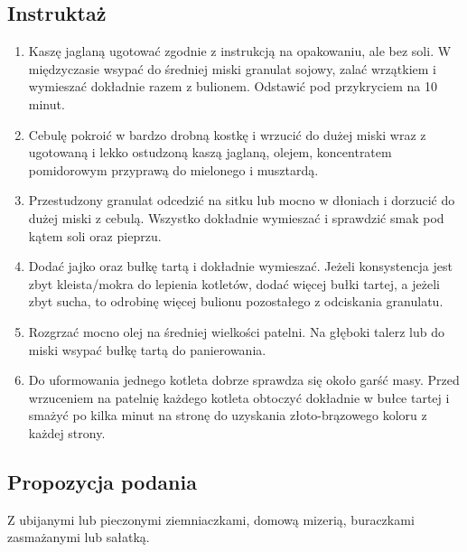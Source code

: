 \documentclass[a4paper,10pt]{book}
\begin{document}
\vspace{0.5cm} 

\subsection*{Instruktaż}
\begin{enumerate}
    \item Kaszę jaglaną ugotować zgodnie z instrukcją na opakowaniu, ale bez soli. W międzyczasie wsypać do średniej miski granulat sojowy, zalać wrzątkiem i wymieszać dokładnie razem z bulionem. Odstawić pod przykryciem na 10 minut.
    \item Cebulę pokroić w bardzo drobną kostkę i wrzucić do dużej miski wraz z ugotowaną i lekko ostudzoną kaszą jaglaną, olejem, koncentratem pomidorowym przyprawą do mielonego i musztardą.
    \item Przestudzony granulat odcedzić na sitku lub mocno w dłoniach i dorzucić do dużej miski z cebulą. Wszystko dokładnie wymieszać i sprawdzić smak pod kątem soli oraz pieprzu. 
    \item Dodać jajko oraz bułkę tartą i dokładnie wymieszać. Jeżeli konsystencja jest zbyt kleista/mokra do lepienia kotletów, dodać więcej bułki tartej, a jeżeli zbyt sucha, to odrobinę więcej bulionu pozostałego z odciskania granulatu.
    \item Rozgrzać mocno olej na średniej wielkości patelni. Na głęboki talerz lub do miski wsypać bułkę tartą do panierowania. 
    \item Do uformowania jednego kotleta dobrze sprawdza się około garść masy. Przed wrzuceniem na patelnię każdego kotleta obtoczyć dokładnie w bułce tartej i smażyć po kilka minut na stronę do uzyskania złoto-brązowego koloru z każdej strony.
\end{enumerate}

\vspace{0.5cm} 

\small
\subsection*{Propozycja podania}
Z ubijanymi lub pieczonymi ziemniaczkami, domową mizerią, buraczkami zasmażanymi lub sałatką.

\vspace{0.3cm}
\end{document}
